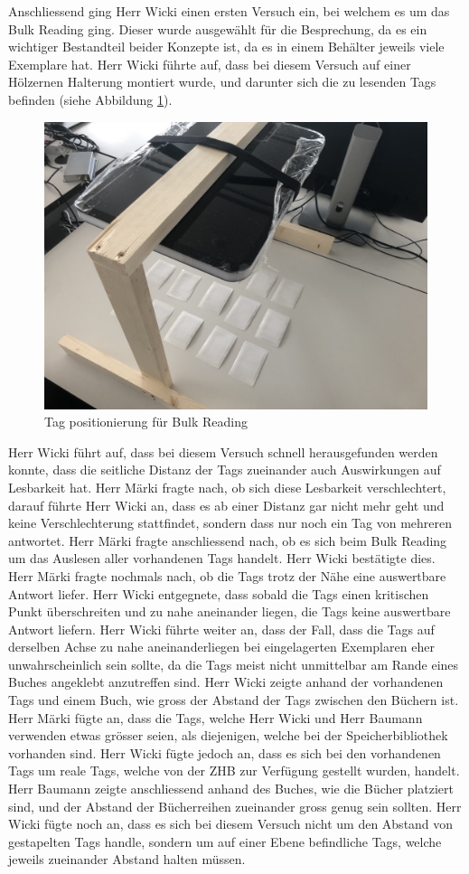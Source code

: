 \documentclass[parskip=full, a4paper]{scrreprt}
\begin{document}
Anschliessend ging Herr Wicki einen ersten Versuch ein, bei welchem es um das Bulk Reading ging. Dieser wurde ausgewählt für die Besprechung, da es ein wichtiger Bestandteil beider Konzepte ist, da es in einem Behälter jeweils viele Exemplare hat. Herr Wicki führte auf, dass bei diesem Versuch auf einer Hölzernen Halterung montiert wurde, und darunter sich die zu lesenden Tags befinden (siehe Abbildung \ref{fig:positionTagsForBulkreading}).
\begin{figure}[htb]
	\centering
	\includegraphics[keepaspectratio,width=.7\linewidth]{img/PositionTagsBulkreading}
	\caption{Tag positionierung für Bulk Reading}
	\label{fig:positionTagsForBulkreading}
\end{figure}
Herr Wicki führt auf, dass bei diesem Versuch schnell herausgefunden werden konnte, dass die seitliche Distanz der Tags zueinander auch Auswirkungen auf Lesbarkeit hat. Herr Märki fragte nach, ob sich diese Lesbarkeit verschlechtert, darauf führte Herr Wicki an, dass es ab einer Distanz gar nicht mehr geht und keine Verschlechterung stattfindet, sondern dass nur noch ein Tag von mehreren antwortet. Herr Märki fragte anschliessend nach, ob es sich beim Bulk Reading um das Auslesen aller vorhandenen Tags handelt. Herr Wicki bestätigte dies. Herr Märki fragte nochmals nach, ob die Tags trotz der Nähe eine auswertbare Antwort liefer. Herr Wicki entgegnete, dass sobald die Tags einen kritischen Punkt überschreiten und zu nahe aneinander liegen, die Tags keine auswertbare Antwort liefern. Herr Wicki führte weiter an, dass der Fall, dass die Tags auf derselben Achse zu nahe aneinanderliegen bei eingelagerten Exemplaren eher unwahrscheinlich sein sollte, da die Tags meist nicht unmittelbar am Rande eines Buches angeklebt anzutreffen sind. Herr Wicki zeigte anhand der vorhandenen Tags und einem Buch, wie gross der Abstand der Tags zwischen den Büchern ist. Herr Märki fügte an, dass die Tags, welche Herr Wicki und Herr Baumann verwenden etwas grösser seien, als diejenigen, welche bei der Speicherbibliothek vorhanden sind. Herr Wicki fügte jedoch an, dass es sich bei den vorhandenen Tags um reale Tags, welche von der ZHB zur Verfügung gestellt wurden, handelt. Herr Baumann zeigte anschliessend anhand des Buches, wie die Bücher platziert sind, und der Abstand der Bücherreihen zueinander gross genug sein sollten. Herr Wicki fügte noch an, dass es sich bei diesem Versuch nicht um den Abstand von gestapelten Tags handle, sondern um auf einer Ebene befindliche Tags, welche jeweils zueinander Abstand halten müssen.
\end{document}
